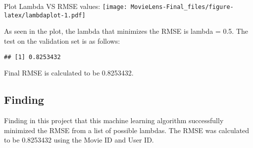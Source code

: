 \documentclass[
]{article}
\newenvironment{Shaded}{\begin{snugshade}}{\end{snugshade}}
\newcommand{\AttributeTok}[1]{\textcolor[rgb]{0.77,0.63,0.00}{#1}}
\newcommand{\FloatTok}[1]{\textcolor[rgb]{0.00,0.00,0.81}{#1}}
\newcommand{\FunctionTok}[1]{\textcolor[rgb]{0.00,0.00,0.00}{#1}}
\newcommand{\NormalTok}[1]{#1}
\newcommand{\OtherTok}[1]{\textcolor[rgb]{0.56,0.35,0.01}{#1}}
\newcommand{\SpecialCharTok}[1]{\textcolor[rgb]{0.00,0.00,0.00}{#1}}
\newcommand{\StringTok}[1]{\textcolor[rgb]{0.31,0.60,0.02}{#1}}
\begin{document}
Plot Lambda VS RMSE values:
\texttt{[image: MovieLens-Final\_files/figure-latex/lambdaplot-1.pdf]}

As seen in the plot, the lambda that minimizes the RMSE is lambda = 0.5.
The test on the validation set is as follows:

\begin{Shaded}
\end{Shaded}

\begin{verbatim}
## [1] 0.8253432
\end{verbatim}

Final RMSE is calculated to be 0.8253432.

\hypertarget{finding}{%
\subsection{Finding}\label{finding}}

Finding in this project that this machine learning algorithm
successfully minimized the RMSE from a list of possible lambdas. The
RMSE was calculated to be 0.8253432 using the Movie ID and User ID.
\end{document}
